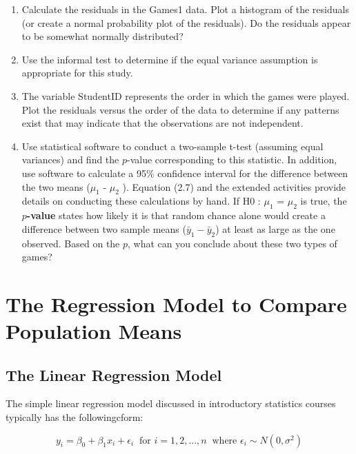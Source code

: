 \documentclass[
]{report}
\providecommand{\tightlist}{%
  \setlength{\itemsep}{0pt}\setlength{\parskip}{0pt}}
\begin{document}
\begin{enumerate}
\def\labelenumi{\arabic{enumi}.}
\setcounter{enumi}{6}
\tightlist
\item
  Calculate the residuals in the Games1 data. Plot a histogram of the residuals (or create a normal probability plot of the residuals). Do the residuals appear to be somewhat normally distributed?
\item
  Use the informal test to determine if the equal variance assumption is appropriate for this study.
\item
  The variable StudentID represents the order in which the games were played. Plot the residuals versus the order of the data to determine if any patterns exist that may indicate that the observations are
  not independent.
\item
  Use statistical software to conduct a two-sample t-test (assuming equal variances) and find the \(p\)-value corresponding to this statistic. In addition, use software to calculate a 95\% confidence interval for
  the difference between the two means (\(\mu_1\) - \(\mu_2\) ). Equation (2.7) and the extended activities provide details on conducting these calculations by hand. If H0 : \(\mu_1\) = \(\mu_2\) is true, the \textbf{\(p\)-value} states how likely it is that random chance alone would create a difference between two sample means (\(\bar{y}_1 - \bar{y}_2\)) at least as large as the one observed. Based on the \(p\), what can you conclude about these two types of
  games?
\end{enumerate}

\newpage

\section{The Regression Model to Compare Population Means}\label{the-regression-model-to-compare-population-means}

\subsection{The Linear Regression Model}\label{the-linear-regression-model}

The simple linear regression model discussed in introductory statistics courses typically has the followingcform:

\begin{equation}
y_i = \beta_0 + \beta_1x_i + \epsilon_i ~\text{ for } i = 1, 2, ... , n ~\text{ where } \epsilon_i \sim N(0,\sigma^2)
\tag{2.2}
\end{equation}
\end{document}
